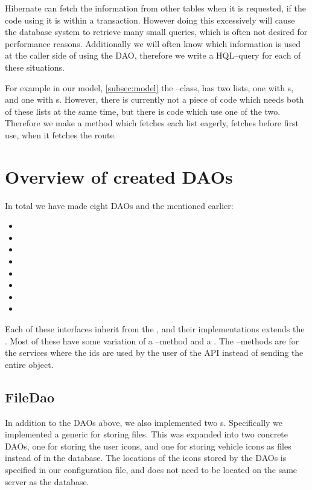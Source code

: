 Hibernate can fetch the information from other tables when it is requested, if the code using it is within a transaction.
However doing this excessively will cause the database system to retrieve many small queries, which is often not desired for performance reasons.
Additionally we will often know which information is used at the caller side of using the \ac{DAO},
therefore we write a \ac{HQL}--query for each of these situations.

For example in our model, \cref{subsec:model} the --class, has two lists,
one with s, and one with s.
However, there is currently not a piece of code which needs both of these lists at the same time, but there is code which use one of the two.
Therefore we make a method which fetches each list eagerly, fetches before first use, when it fetches the route.

\section{Overview of created \acp{DAO}}
In total we have made eight \acp{DAO} and the  mentioned earlier:
\begin{multicols}{2}
\begin{itemize}
    \item {}
    \item {}
    \item {}
    \item {}
    \item {}
    \item {}
    \item {}
    \item {}
\end{itemize}
\end{multicols}

Each of these interfaces inherit from the , and their implementations extends the .
Most of these have some variation of a --method and a .
The --methods are for the services where the ids are used by the user of the API instead of sending the entire object.

\subsection{FileDao}\label{subsec:filedao}
In addition to the \acp{DAO} above, we also implemented two s. 
Specifically we implemented a generic  for storing files.
This was expanded into two concrete \acp{DAO}, one for storing the user icons, and one for storing vehicle icons as files instead of in the database.
The locations of the icons stored by the \acp{DAO} is specified in our configuration file, and does not need to be located on the same server as the database.

